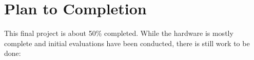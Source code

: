 \documentclass [11pt, proquest] {uwthesis}[2020/02/24]
\begin{document}

\chapter{Plan to Completion}

This final project is about 50\% completed. While the hardware is mostly complete and initial evaluations have been conducted, there is still work to be done:






\end{document}
